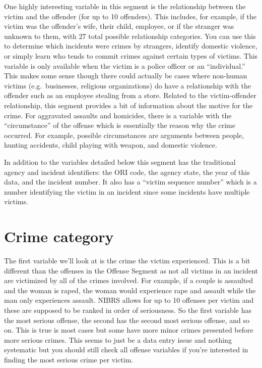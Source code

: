 \documentclass[
  12pt,
  openany]{book}
\begin{document}
One highly interesting variable in this segment is the relationship between the victim and the offender (for up to 10 offenders). This includes, for example, if the victim was the offender's wife, their child, employee, or if the stranger was unknown to them, with 27 total possible relationship categories. You can use this to determine which incidents were crimes by strangers, identify domestic violence, or simply learn who tends to commit crimes against certain types of victims. This variable is only available when the victim is a police officer or an ``individual.'' This makes some sense though there could actually be cases where non-human victims (e.g.~businesses, religious organizations) do have a relationship with the offender such as an employee stealing from a store. Related to the victim-offender relationship, this segment provides a bit of information about the motive for the crime. For aggravated assaults and homicides, there is a variable with the ``circumstance'' of the offense which is essentially the reason why the crime occurred. For example, possible circumstances are arguments between people, hunting accidents, child playing with weapon, and domestic violence.

In addition to the variables detailed below this segment has the traditional agency and incident identifiers: the ORI code, the agency state, the year of this data, and the incident number. It also has a ``victim sequence number'' which is a number identifying the victim in an incident since some incidents have multiple victims.

\section{Crime category}\label{crime-category-1}

The first variable we'll look at is the crime the victim experienced. This is a bit different than the offenses in the Offense Segment as not all victims in an incident are victimized by all of the crimes involved. For example, if a couple is assaulted and the woman is raped, the woman would experience rape and assault while the man only experiences assault. NIBRS allows for up to 10 offenses per victim and these are supposed to be ranked in order of seriousness. So the first variable has the most serious offense, the second has the second most serious offense, and so on. This is true is most cases but some have more minor crimes presented before more serious crimes. This seems to just be a data entry issue and nothing systematic but you should still check all offense variables if you're interested in finding the most serious crime per victim.
\end{document}
